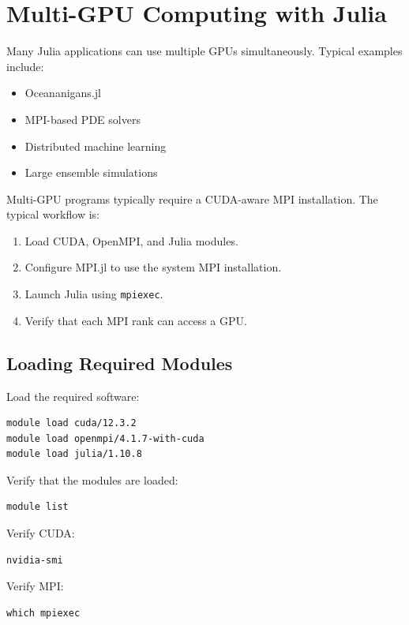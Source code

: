 \section{Multi-GPU Computing with Julia} 

Many Julia applications can use multiple GPUs simultaneously. Typical examples include: 

\begin{itemize} 
\item Oceananigans.jl 
\item MPI-based PDE solvers 
\item Distributed machine learning 
\item Large ensemble simulations 
\end{itemize} 

Multi-GPU programs typically require a CUDA-aware MPI installation. The typical workflow is: 

\begin{enumerate} 
\item Load CUDA, OpenMPI, and Julia modules. 
\item Configure MPI.jl to use the system MPI installation. 
\item Launch Julia using \texttt{mpiexec}. 
\item Verify that each MPI rank can access a GPU. \end{enumerate} 

\subsection{Loading Required Modules} 

Load the required software: 

\begin{lstlisting} 
module load cuda/12.3.2 
module load openmpi/4.1.7-with-cuda 
module load julia/1.10.8 
\end{lstlisting} 

Verify that the modules are loaded: 

\begin{lstlisting} 
module list 
\end{lstlisting} 

Verify CUDA: 

\begin{lstlisting} 
nvidia-smi 
\end{lstlisting} 

Verify MPI: 

\begin{lstlisting} 
which mpiexec 
\end{lstlisting}



